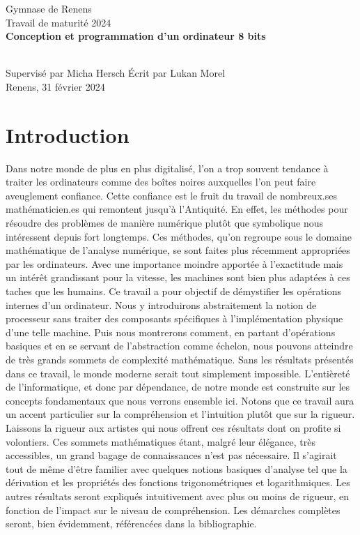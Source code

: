 \documentclass{article}
\begin{document}
\begin{titlepage}
\begin{center}
    \LARGE
    Gymnase de Renens
    \vspace{2cm} \ \\
    Travail de maturité 2024
    \vspace{5cm} \ \\
    \Huge
    \textbf{Conception et programmation d'un ordinateur 8 bits}
\end{center}
\Large
\vspace{5cm} \ \\
Supervisé par Micha Hersch
\hfill
Écrit par Lukan Morel
\vspace{2cm} \ \\
Renens, 31 février 2024
\end{titlepage}
\pagebreak
{}
\pagestyle{fancy}
\cfoot{}
\tableofcontents
\newpage
\section{Introduction}
Dans notre monde de plus en plus digitalisé, l'on a trop souvent tendance à traiter les ordinateurs comme des boîtes noires auxquelles l'on peut faire aveuglement confiance. Cette confiance est le fruit du travail de nombreux.ses mathématicien.es qui remontent jusqu'à l'Antiquité. En effet, les méthodes pour résoudre des problèmes de manière numérique plutôt que symbolique nous intéressent depuis fort longtemps. Ces méthodes, qu'on regroupe sous le domaine mathématique de l'analyse numérique, se sont faites plus récemment appropriées par les ordinateurs. Avec une importance moindre apportée à l'exactitude mais un intérêt grandissant pour la vitesse, les machines sont bien plus adaptées à ces taches que les humains.
Ce travail a pour objectif de démystifier les opérations internes d'un ordinateur.
Nous y introduirons abstraitement la notion de processeur sans traiter des composants spécifiques à l'implémentation physique d'une telle machine. 
Puis nous montrerons comment, en partant d'opérations basiques et en se servant de l'abstraction comme échelon, nous pouvons atteindre de très grands sommets de complexité mathématique. Sans les résultats présentés dans ce travail, le monde moderne serait tout simplement impossible. L'entièreté de l'informatique, et donc par dépendance, de notre monde est construite sur les concepts fondamentaux que nous verrons ensemble ici. Notons que ce travail aura un accent particulier sur la compréhension et l'intuition plutôt que sur la rigueur. Laissons la rigueur aux artistes qui nous offrent ces résultats dont on profite si volontiers.
Ces sommets mathématiques étant, malgré leur élégance, très accessibles, un grand bagage de connaissances n'est pas nécessaire. Il s'agirait tout de même d'être familier avec quelques notions basiques d'analyse tel que la dérivation et les propriétés des fonctions trigonométriques et logarithmiques. Les autres résultats seront expliqués intuitivement avec plus ou moins de rigueur, en fonction de l'impact sur le niveau de compréhension. Les démarches complètes seront, bien évidemment, référencées dans la bibliographie.
\end{document}
